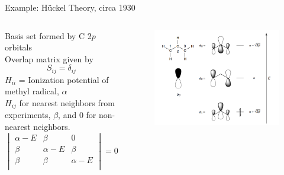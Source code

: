 \documentclass[aspectratio=169]{beamer}
\begin{document}
    \begin{frame}{Example: H\"uckel Theory, circa 1930}
        \begin{columns}
            Basis set formed by C 2$p$ orbitals\\
            Overlap matrix given by
            \begin{equation*}
                S_{ij} = \delta_{ij}
            \end{equation*}
            $H_{ii}$ = Ionization potential of methyl radical, $\alpha$\\
            $H_{ij}$ for nearest neighbors from experiments, $\beta$, and 0 for non-nearest neighbors.
            \begin{equation*}
                \begin{vmatrix}
                    \alpha-E & \beta    & 0        \\
                    \beta    & \alpha-E & \beta    \\
                    \beta    & \beta    & \alpha-E \\
                \end{vmatrix}
                = 0
            \end{equation*}
            \begin{figure}
                \centering
                \includegraphics[width=\linewidth]{lectures/figures/2_alkene.png}
            \end{figure}
        \end{columns}
    \end{frame}
\end{document}
